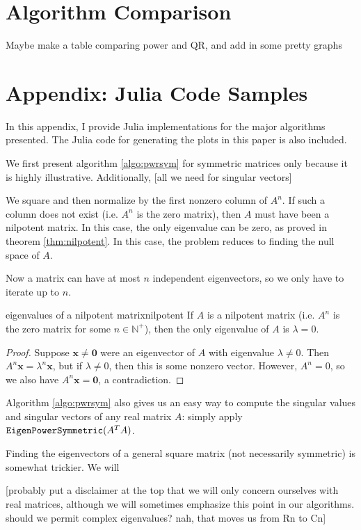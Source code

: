 \documentclass{article}
\let\vec\mathbf
\begin{document}
\section{Algorithm Comparison}
Maybe make a table comparing power and QR, and add in some pretty graphs

\section{Appendix: Julia Code Samples}
In this appendix, I provide Julia implementations for the major algorithms presented. The Julia code for generating the plots in this paper is also included.

We first present algorithm \ref{algo:pwrsym} for symmetric matrices only because it is highly illustrative. Additionally, [all we need for singular vectors]

We square and then normalize by the first nonzero column of $A^n$. If such a column does not exist (i.e. $A^n$ is the zero matrix), then $A$ must have been a nilpotent matrix. In this case, the only eigenvalue can be zero, as proved in theorem \ref{thm:nilpotent}. In this case, the problem reduces to finding the null space of $A$.

Now a matrix can have at most $n$ independent eigenvectors, so we only have to iterate up to $n$.

\begin{theorem}{eigenvalues of a nilpotent matrix}{nilpotent}
  If $A$ is a nilpotent matrix (i.e. $A^n$ is the zero matrix for some $n \in \mathbb{N}^+$), then the only eigenvalue of $A$ is $\lambda = 0$.
  \begin{proof}
    Suppose $\vec{x} \neq \vec{0}$ were an eigenvector of $A$ with eigenvalue $\lambda \neq 0$. Then $A^n\vec{x} = \lambda^n\vec{x}$, but if $\lambda \neq 0$, then this is some nonzero vector. However, $A^n = 0$, so we also have $A^n\vec{x} = \vec{0}$, a contradiction.
  \end{proof}
\end{theorem}

Algorithm \ref{algo:pwrsym} also gives us an easy way to compute the singular values and singular vectors of any real matrix $A$: simply apply $\textrm{\texttt{EigenPowerSymmetric}}(A^TA)$.

Finding the eigenvectors of a general square matrix (not necessarily symmetric) is somewhat trickier. We will

[probably put a disclaimer at the top that we will only concern ourselves with real matrices, although we will sometimes emphasize this point in our algorithms. should we permit complex eigenvalues? nah, that moves us from Rn to Cn]
\end{document}
